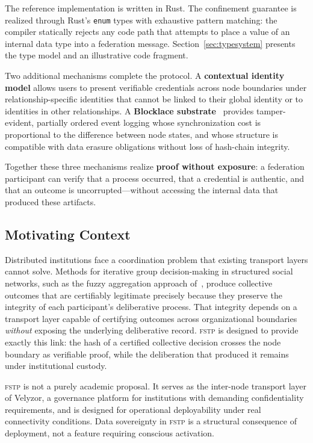 \documentclass[12pt]{article}
\newcommand{\FSTP}{\textsc{fstp}}
\begin{document}
	The reference implementation is written in Rust. The confinement
	guarantee is realized through Rust's \texttt{enum} types with
	exhaustive pattern matching: the compiler statically rejects any code
	path that attempts to place a value of an internal data type into a
	federation message. Section~\ref{sec:typesystem} presents the type
	model and an illustrative code fragment.
	
	Two additional mechanisms complete the protocol. A
	\textbf{contextual identity model} allows users to present verifiable
	credentials across node boundaries under relationship-specific
	identities that cannot be linked to their global identity or to
	identities in other relationships. A \textbf{Blocklace
		substrate}~\cite{shapiro2023grassroots,keidar2023cordial} provides
	tamper-evident, partially ordered event logging whose synchronization
	cost is proportional to the difference between node states, and whose
	structure is compatible with data erasure obligations without loss of
	hash-chain integrity.
	
	Together these three mechanisms realize \textbf{proof without
		exposure}: a federation participant can verify that a process
	occurred, that a credential is authentic, and that an outcome is
	uncorrupted---without accessing the internal data that produced these
	artifacts.
	
	\subsection{Motivating Context}
	\label{sec:motivation}
	
	Distributed institutions face a coordination problem that existing
	transport layers cannot solve. Methods for iterative group decision-making
	in structured social networks, such as the fuzzy aggregation
	approach of~\cite{soto2016mqdm}, produce collective outcomes that are
	certifiably legitimate precisely because they preserve the integrity
	of each participant's deliberative process. That integrity depends on
	a transport layer capable of certifying outcomes across organizational
	boundaries \emph{without} exposing the underlying deliberative record.
	\FSTP{} is designed to provide exactly this link: the hash of a
	certified collective decision crosses the node boundary as verifiable
	proof, while the deliberation that produced it remains under
	institutional custody.
	
	\FSTP{} is not a purely academic proposal. It serves as the inter-node
	transport layer of Velyzor, a governance platform for institutions with
	demanding confidentiality requirements, and is designed for
	operational deployability under real connectivity conditions. Data
	sovereignty in \FSTP{} is a structural consequence of deployment, not
	a feature requiring conscious activation.
	
\end{document}
